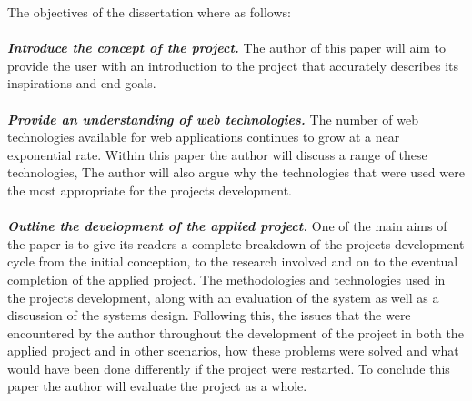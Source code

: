 The objectives of the dissertation where as follows: \\ \\
\textbf{\emph{Introduce the concept of the project.}} The author of this paper will aim to provide the user with an introduction to the project that accurately describes its inspirations and end-goals. \\ \\
\textbf{\emph{Provide an understanding of web technologies.}} The number of web technologies available for web applications continues to grow at a near exponential rate. Within this paper the author will discuss a range of these technologies, The author will also argue why the technologies that were used were the most appropriate for the projects development. \\ \\
\textbf{\emph{Outline the development of the applied project.}} One of the main aims of the paper is to give its readers a complete breakdown of the projects development cycle from the initial conception, to the research involved and on to the eventual completion of the applied project. The methodologies and technologies used in the projects development, along with an evaluation of the system as well as a discussion of the systems design. Following this, the issues that the were encountered by the author throughout the development of the project in both the applied project and in other scenarios, how these problems were solved and what would have been done differently if the project were restarted. To conclude this paper the author will evaluate the project as a whole. \\ \\

